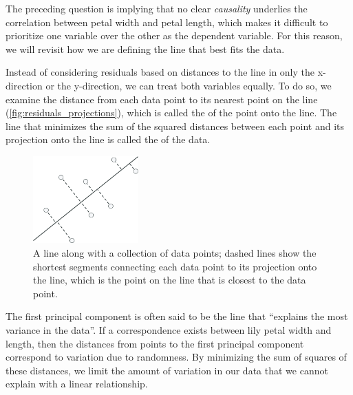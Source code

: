 \begin{note}\end{note}

\begin{qbox}\end{qbox}

The preceding question is implying that no clear \textit{causality} underlies the correlation between petal width and petal length, which makes it difficult to prioritize one variable over the other as the dependent variable. For this reason, we will revisit how we are defining the line that best fits the data.

Instead of considering residuals based on distances to the line in only the x-direction or the y-direction, we can treat both variables equally. To do so, we examine the distance from each data point to its nearest point on the line (\autoref{fig:residuals_projections}), which is called the  of the point onto the line. The line that minimizes the sum of the squared distances between each point and its projection onto the line is called the  of the data.\\

\begin{figure}[h]
\centering
\mySfFamily
\includegraphics[width = 0.36\textwidth]{../images_CMYK/residuals_projections}
\caption{A line along with a collection of data points; dashed lines show the shortest segments connecting each data point to its projection onto the line, which is the point on the line that is closest to the data point.}
\label{fig:residuals_projections}
\end{figure}

The first principal component is often said to be the line that ``explains the most variance in the data''. If a correspondence exists between lily petal width and length, then the distances from points to the first principal component correspond to variation due to randomness. By minimizing the sum of squares of these distances, we limit the amount of variation in our data that we cannot explain with a linear relationship.

